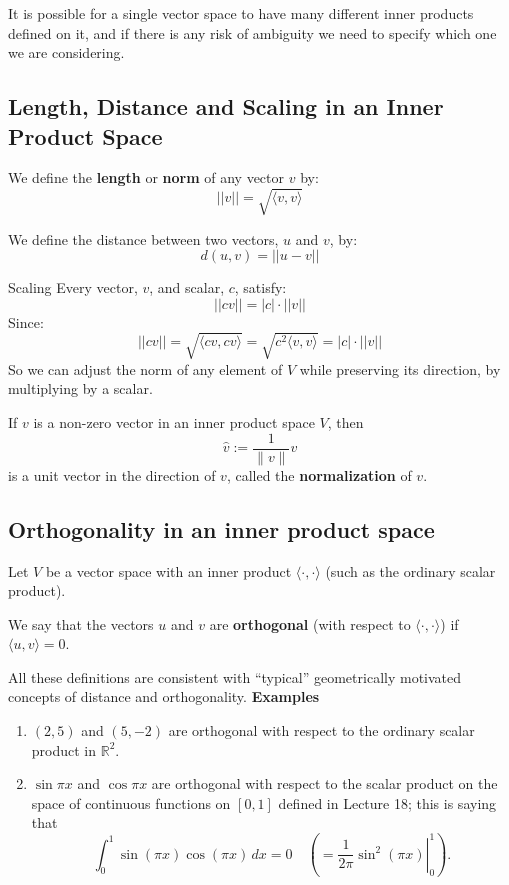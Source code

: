 \documentclass[a4paper, 9pt]{extarticle}
\begin{document}
It is possible for a single vector space to have many different inner products defined on it, and if there is any risk of ambiguity we need to specify which one we are considering.
\subsection{Length, Distance and Scaling in an Inner Product Space}
\begin{definitionbox}{}{}
  We define the \textbf{length} or \textbf{norm} of any vector $v$ by:
  $$
    ||v|| = \sqrt{\langle v, v \rangle}
  $$
\end{definitionbox}
\begin{definitionbox}{}{}
  We define the distance between two vectors, $u$ and $v$, by:
  $$
    d(u, v) = ||u - v||
  $$
\end{definitionbox}
\begin{conceptbox}{Scaling}{}
  Every vector, $v$, and scalar, $c$, satisfy:
  $$
    ||cv|| = |c| \cdot ||v||
  $$
  Since:
  $$
    ||cv|| = \sqrt{\langle cv, cv \rangle} = \sqrt{c^2\langle v, v \rangle} = |c| \cdot ||v||
  $$
  So we can adjust the norm of any element of $V$ while preserving its direction, by multiplying by a scalar.
\end{conceptbox}
\begin{definitionbox}{}{}
  If $v$ is a non-zero vector in an inner product space $V$, then
  $$
    \hat{v} := \frac{1}{\|v\|}v
  $$
  is a unit vector in the direction of $v$, called the \textbf{normalization} of $v$.
\end{definitionbox}
\subsection{Orthogonality in an inner product space}
Let $V$ be a vector space with an inner product $\langle \cdot, \cdot \rangle$ (such as the ordinary scalar product).
\begin{definitionbox}{}{}
  We say that the vectors $u$ and $v$ are \textbf{orthogonal} (with respect to $\langle \cdot, \cdot \rangle$) if $\langle u, v \rangle = 0$.
\end{definitionbox}

All these definitions are consistent with “typical” geometrically motivated concepts of distance and orthogonality.
\textbf{Examples}
\begin{enumerate}
  \item $(2, 5)$ and $(5, -2)$ are orthogonal with respect to the ordinary scalar product in $\mathbb{R}^2$.

  \item $\sin \pi x$ and $\cos \pi x$ are orthogonal with respect to the scalar product on the space of continuous functions on $[0, 1]$ defined in Lecture 18; this is saying that
        $$
          \int_0^1 \sin(\pi x) \cos(\pi x) \, dx = 0 \quad \left(= \left. \frac{1}{2\pi} \sin^2(\pi x) \right|_0^1 \right).
        $$
\end{enumerate}
\end{document}
